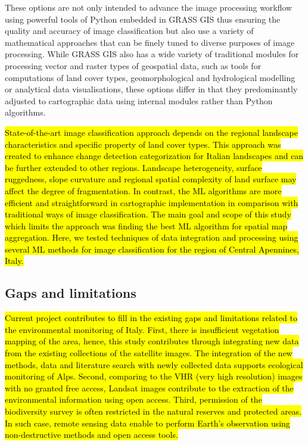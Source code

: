\documentclass[eprint,
approc,		%
]{actapoly}
\begin{document}
These options are not only intended to advance the image processing workflow using powerful tools of Python embedded in GRASS GIS thus ensuring the quality and accuracy of image classification but also use a variety of mathematical approaches that can be finely tuned to diverse purposes of image processing. While GRASS GIS also has a wide variety of traditional modules for processing vector and raster types of geospatial data, such as tools for computations of land cover types, geomorphological and hydrological modelling or analytical data visualisations, these options differ in that they predominantly adjusted to cartographic data using internal modules rather than Python algorithms. 

\hl{State-of-the-art image classification approach depends on the regional landscape characteristics and specific property of land cover types. This approach was created to enhance change detection categorization for Italian landscapes and can be further extended to other regions. Landscape heterogeneity, surface ruggedness, slope curvature and regional spatial complexity of land surface may affect the degree of fragmentation. In contrast, the ML algorithms are more efficient and straightforward in cartographic implementation in comparison with traditional ways of image classification. The main goal and scope of this study which limits the approach was finding the best ML algorithm for spatial map aggregation. Here, we tested techniques of data integration and processing using several ML methods for image classification for the region of Central Apennines, Italy.}

\subsection{Gaps and limitations}

\hl{Current project contributes to fill in the existing gaps and limitations related to the environmental monitoring of Italy. First, there is insufficient vegetation mapping of the area, hence, this study contributes through integrating new data from the existing collections of the satellite images. The integration of the new methods, data and literature search with newly collected data supports ecological monitoring of Alps. Second, comparing to the VHR (very high resolution) images with no granted free access, Landsat images contribute to the extraction of the environmental information using open access. Third, permission of the biodiversity survey is often restricted in the natural reserves and protected areas. In such case, remote sensing data enable to perform Earth's observation using non-destructive methods and open access tools.}
\end{document}
